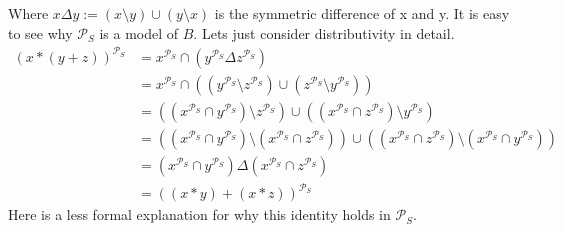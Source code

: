 	Where $x\Delta y:=(x\setminus y)\cup(y\setminus x)$ is the symmetric difference of x and y. It is easy to see why $\mathcal{P}_S$ is a model of $B$. Lets just consider distributivity in detail.
	\begin{align*}
		\left( x*\left( y+z\right) \right) ^{\mathcal{P}_S} & =x^{\mathcal{P}_S}\cap\left( y^{\mathcal{P}_S}\Delta z^{\mathcal{P}_S}\right)                                                                                                                                                                                                  \\
		                                                    & =x^{\mathcal{P}_S}\cap\left( \left( y^{\mathcal{P}_S}\setminus z^{\mathcal{P}_S}\right) \cup\left( z^{\mathcal{P}_S}\setminus y^{\mathcal{P}_S}\right) \right)                                                                                                                 \\
		                                                    & =\left( \left( x^{\mathcal{P}_S}\cap y^{\mathcal{P}_S}\right) \setminus z^{\mathcal{P}_S}\right) \cup\left( \left( x^{\mathcal{P}_S}\cap z^{\mathcal{P}_S}\right) \setminus y^{\mathcal{P}_S}\right)                                                                           \\
		                                                    & =\left( \left( x^{\mathcal{P}_S}\cap y^{\mathcal{P}_S}\right) \setminus \left( x^{\mathcal{P}_S}\cap z^{\mathcal{P}_S}\right) \right) \cup\left( \left( x^{\mathcal{P}_S}\cap z^{\mathcal{P}_S}\right) \setminus \left( x^{\mathcal{P}_S}\cap y^{\mathcal{P}_S}\right) \right) \\
		                                                    & =\left( x^{\mathcal{P}_S}\cap y^{\mathcal{P}_S}\right) \Delta \left( x^{\mathcal{P}_S}\cap z^{\mathcal{P}_S}\right)                                                                                                                                                            \\
		                                                    & =\left( \left( x*y\right) +\left( x*z\right)\right)^{\mathcal{P}_S}                                                                                                                                                                                                            
	\end{align*}
	Here is a less formal explanation for why this identity holds in $\mathcal{P}_S$.\\

